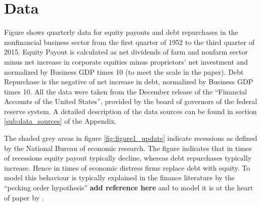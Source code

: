 
\section{Data}
\label{sec:data}

Figure \pageref{fig:figure1_update} shows quarterly data for equity payouts and
debt repurchases in the nonfinancial business sector from the first quarter of
1952 to the third quarter of 2015. Equity Payout is calculated as net
dividends of farm and nonfarm sector minus net increase in corporate equities
minus proprietors’ net investment and normalized by Business GDP times 10 (to
meet the scale in the paper). Debt Repurchase is the negative of net increase in
debt, normalized by Business GDP times 10. All the data were taken from the
December release of the ``Financial Accounts of the United States'', provided
by the board of governors of the federal reserve system. A detailed description
of the data sources can be found in section \ref{sub:data_sources} of the
Appendix. 



The shaded grey areas in figure \ref{fig:figure1_update} indicate recessions as
defined by the National Bureau of economic research. The figure indicates that
in times of recessions equity payout typically decline, whereas debt
repurchases typically increase. Hence in times of economic distress firms
replace debt with equity. To model this behaviour is typically explained in the
finance literature by the ``pecking order hypothesis'' \textbf{add reference
  here} and to model it is at the heart of paper by
\textcite{jerman_macroeconomic_2012}.

